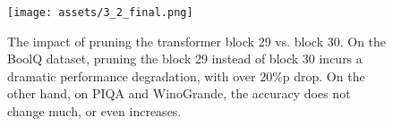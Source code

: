 \begin{figure}[t]
\begin{center}
\centerline{\texttt{[image: assets/3\_2\_final.png]}}
\caption{The impact of pruning the transformer block 29 vs. block 30. On the BoolQ dataset, pruning the block 29 instead of block 30 incurs a dramatic performance degradation, with over 20\%p drop. On the other hand, on PIQA and WinoGrande, the accuracy does not change much, or even increases.}
\label{Impact on pruning block 29 on BoolQ}
\end{center}
\end{figure}